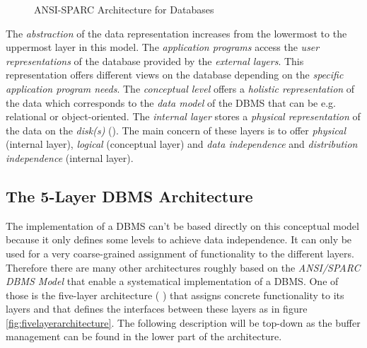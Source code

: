 \begin{@empty}
\begin{figure}[ht!]
{
		}
		\caption{ANSI-SPARC Architecture for Databases}
		\label{fig:ansisparcarchitecture}
	\end{figure}
\end{@empty}
	
	The \emph{abstraction} of the data representation increases from the lowermost to the uppermost layer in this model. The \emph{application programs} access the \emph{user representations} of the database provided by the \emph{external layers}. This representation offers different views on the database depending on the \emph{specific application program needs}. The \emph{conceptual level} offers a \emph{holistic representation} of the data which corresponds to the \emph{data model} of the DBMS that can be e.g. relational or object-oriented. The \emph{internal layer} stores a \emph{physical representation} of the data on the \emph{disk(s)} (\cite{udemy_ANSI-SPARC}). The main concern of these layers is to offer \emph{physical} (internal layer), \emph{logical} (conceptual layer) and \emph{data independence} and \emph{distribution independence} (internal layer).

\subsection[5-Layer DBMS Architecture]{The 5-Layer DBMS Architecture}

	The implementation of a DBMS can't be based directly on this conceptual model because it only defines some levels to achieve data independence. It can only be used for a very coarse-grained assignment of functionality to the different layers. Therefore there are many other architectures roughly based on the \emph{ANSI/SPARC DBMS Model} that enable a systematical implementation of a DBMS. One of those is the five-layer architecture (\cite{Haerder:1983} \cite{Haerder:1985}) that assigns concrete functionality to its layers and that defines the interfaces between these layers as in figure \ref{fig:fivelayerarchitecture}. The following description will be top-down as the buffer management can be found in the lower part of the architecture.
	
